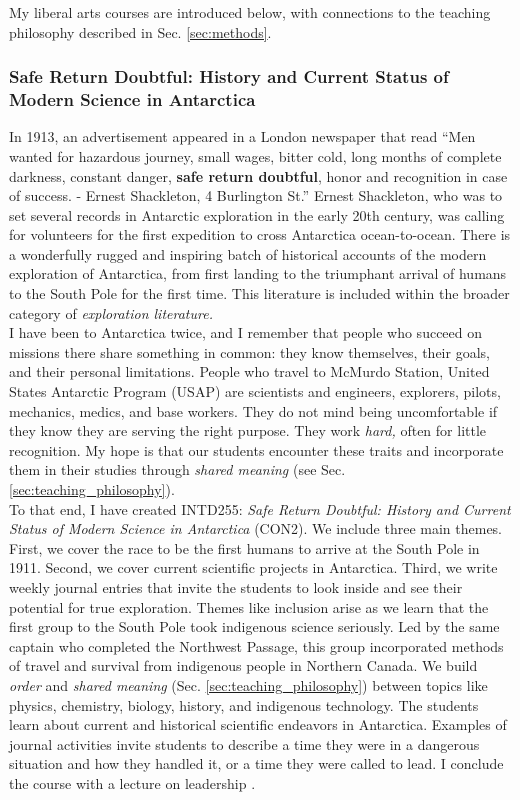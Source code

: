 \documentclass[../../../main.tex]{subfiles}
\begin{document}
My liberal arts courses are introduced below, with connections to the teaching philosophy described in Sec. \ref{sec:methods}.

\subsubsection{Safe Return Doubtful: History and Current Status of Modern Science in Antarctica}

In 1913, an advertisement appeared in a London newspaper that read ``Men wanted for hazardous journey, small wages, bitter cold, long months of complete darkness, constant danger, \textbf{safe return doubtful}, honor and recognition in case of success. - Ernest Shackleton, 4 Burlington St.''  Ernest Shackleton, who was to set several records in Antarctic exploration in the early 20th century, was calling for volunteers for the first expedition to cross Antarctica ocean-to-ocean.  There is a wonderfully rugged and inspiring batch of historical accounts of the modern exploration of Antarctica, from first landing to the triumphant arrival of humans to the South Pole for the first time.  This literature is included within the broader category of \textit{exploration literature.}
\\
\vspace{0.15cm}
I have been to Antarctica twice, and I remember that people who succeed on missions there share something in common: they know themselves, their goals, and their personal limitations.  People who travel to McMurdo Station, United States Antarctic Program (USAP) are scientists and engineers, explorers, pilots, mechanics, medics, and base workers.  They do not mind being uncomfortable if they know they are serving the right purpose.  They work \textit{hard,} often for little recognition.  My hope is that our students encounter these traits and incorporate them in their studies through \textit{shared meaning} (see Sec. \ref{sec:teaching_philosophy}).
\\
\vspace{0.15cm}
To that end, I have created INTD255: \textit{Safe Return Doubtful: History and Current Status of Modern Science in Antarctica} (CON2).  We include three main themes. First, we cover the race to be the first humans to arrive at the South Pole in 1911.  Second, we cover current scientific projects in Antarctica.  Third, we write weekly journal entries that invite the students to look inside and see their potential for true exploration.  Themes like inclusion arise as we learn that the first group to the South Pole took indigenous science seriously.  Led by the same captain who completed the Northwest Passage, this group incorporated methods of travel and survival from indigenous people in Northern Canada.  We build \textit{order} and \textit{shared meaning} (Sec. \ref{sec:teaching_philosophy}) between topics like physics, chemistry, biology, history, and indigenous technology.  The students learn about current and historical scientific endeavors in Antarctica.  Examples of journal activities invite students to describe a time they were in a dangerous situation and how they handled it, or a time they were called to lead.  I conclude the course with a lecture on leadership \cite{west_point}.
\end{document}
